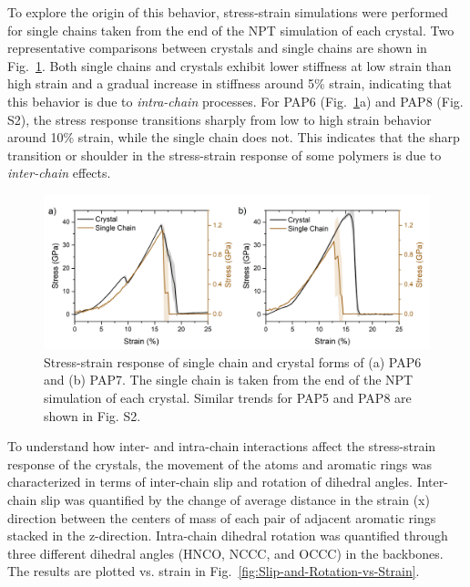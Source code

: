 \documentclass[journal=langd5,manuscript=article]{achemso}
\begin{document}
To explore the origin of this behavior, stress-strain simulations were performed for single chains taken from the end of the NPT simulation of each crystal.
Two representative comparisons between crystals and single chains are shown in Fig.~\ref{fig:Stress-strain-Curve-SingleChain-vs-Crystal}.
Both single chains and crystals exhibit lower stiffness at low strain than high strain and a gradual increase in stiffness around 5\% strain, indicating that this behavior is due to \textit{intra-chain} processes.
For PAP6 (Fig.~\ref{fig:Stress-strain-Curve-SingleChain-vs-Crystal}a) and PAP8 (Fig. S2), the stress response transitions sharply from low to high strain behavior around 10\% strain, while the single chain does not. 
This indicates that the sharp transition or shoulder in the stress-strain response of some polymers is due to \textit{inter-chain} effects.
 

\begin{figure}[h!]
\centering
\includegraphics[scale=0.45]{Stress-strain-Curve-SingleChain-vs-Crystal.png}
\caption{Stress-strain response of single chain and crystal forms of (a) PAP6 and (b) PAP7. The single chain is taken from the end of the NPT simulation of each crystal. Similar trends for PAP5 and PAP8 are shown in Fig. S2.}
\label{fig:Stress-strain-Curve-SingleChain-vs-Crystal}
\end{figure}


\FloatBarrier
To understand how inter- and intra-chain interactions affect the stress-strain response of the crystals, the movement of the atoms and aromatic rings was characterized in terms of inter-chain slip and rotation of dihedral angles.
Inter-chain slip was quantified by the change of average distance in the strain (x) direction between the centers of mass of each pair of adjacent aromatic rings stacked in the z-direction.
Intra-chain dihedral rotation was quantified through three different dihedral angles (HNCO, NCCC, and OCCC) in the backbones.
The results are plotted vs. strain in Fig.~\ref{fig:Slip-and-Rotation-vs-Strain}.
 
\end{document}
